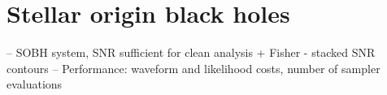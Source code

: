 \documentclass[aps,showpacs,twocolumn,prd,superscriptaddress,nofootinbib]{revtex4-1}
\newcommand{\be}{\begin{equation}}
\newcommand{\ee}{\end{equation}}
\newcommand\calA{{\mathcal{A}}}
\newcommand\varphiL{{\varphi_{L}}}
\newcommand\psiL{{\psi_{L}}}
\begin{document}
%
%


\section{Stellar origin black holes}
\label{sec:SOBH}

-- SOBH system, SNR sufficient for clean analysis + Fisher - stacked SNR contours
-- Performance: waveform and likelihood costs, number of sampler evaluations
\end{document}
